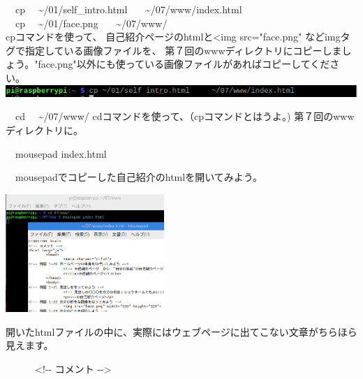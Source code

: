 \begin{minipage}[b]{0.5\textwidth}
	\begin{enumerate}
		\begin{minipage}[b]{1.5\textwidth}
			\item \ \ cp \ \ {\textasciitilde}/01/self\_intro.html \ \ \ {\textasciitilde}/07/www/index.html\\
			\ \ cp \ \ {\textasciitilde}/01/face.png \ \ \ {\textasciitilde}/07/www/\\
			cpコマンドを使って、 自己紹介ページのhtmlと<img src="face.png" などimgタグで指定している画像ファイルを、 第７回のwwwディレクトリにコピーしましょう。"face.png"以外にも使っている画像ファイルがあればコピーしてください。\\
			\includegraphics[width=14.73cm]{text07-img/ome7-img033.png}
			\bigskip
		\end{minipage}

		\bigskip
		
		\item

		      \ \ cd \ \ {\textasciitilde}/07/www/\newline
		      cdコマンドを使って、（cpコマンドとはうよ。) 第７回のwwwディレクトリに。


		\item \ \ mousepad index.html

		      \ \ mousepadでコピーした自己紹介のhtmlを開いてみよう。

	\end{enumerate}
\end{minipage}

\includegraphics[width=0.45\textwidth]{text07-img/ome7-img034.png}

\bigskip

開いたhtmlファイルの中に、実際にはウェブページに出てこない文章がちらほら見えます。

\ \ \ \ \ \ {\textless}!-{}- コメント -{}-{\textgreater}

